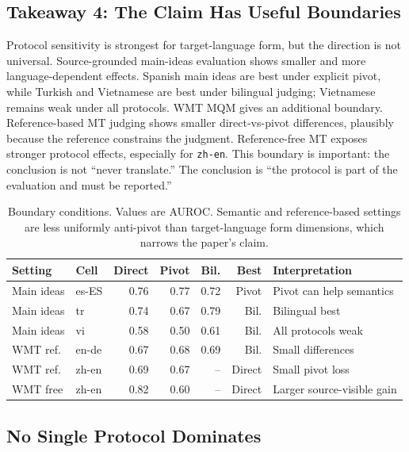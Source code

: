\documentclass{article}
\begin{document}
\subsection{Takeaway 4: The Claim Has Useful Boundaries}

Protocol sensitivity is strongest for target-language form, but the direction is not universal. Source-grounded main-ideas evaluation shows smaller and more language-dependent effects. Spanish main ideas are best under explicit pivot, while Turkish and Vietnamese are best under bilingual judging; Vietnamese remains weak under all protocols. WMT MQM gives an additional boundary. Reference-based MT judging shows smaller direct-vs-pivot differences, plausibly because the reference constrains the judgment. Reference-free MT exposes stronger protocol effects, especially for \texttt{zh-en}. This boundary is important: the conclusion is not ``never translate.'' The conclusion is ``the protocol is part of the evaluation and must be reported.''

\begin{table}[t]
\centering
\caption{Boundary conditions. Values are AUROC. Semantic and reference-based settings are less uniformly anti-pivot than target-language form dimensions, which narrows the paper's claim.}
\label{tab:boundary_results}
\small
\setlength{\tabcolsep}{4pt}
\begin{tabular*}{\linewidth}{@{\extracolsep{\fill}}llrrrrl}
\toprule
Setting & Cell & Direct & Pivot & Bil. & Best & Interpretation \\
\midrule
Main ideas & es-ES & 0.76 & 0.77 & 0.72 & Pivot & Pivot can help semantics \\
Main ideas & tr & 0.74 & 0.67 & 0.79 & Bil. & Bilingual best \\
Main ideas & vi & 0.58 & 0.50 & 0.61 & Bil. & All protocols weak \\
WMT ref. & en-de & 0.67 & 0.68 & 0.69 & Bil. & Small differences \\
WMT ref. & zh-en & 0.69 & 0.67 & -- & Direct & Small pivot loss \\
WMT free & zh-en & 0.82 & 0.60 & -- & Direct & Larger source-visible gain \\
\bottomrule
\end{tabular*}
\end{table}

\subsection{No Single Protocol Dominates}
\end{document}
